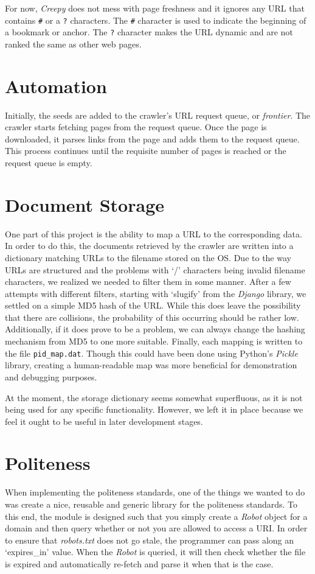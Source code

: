 \documentclass[letterpaper,11pt,twoside]{article}
\begin{document}
For now, \emph{Creepy} does not mess with page freshness and it ignores any URL that contains \texttt{\#} or a \texttt{?} characters. The \texttt{\#} character is used to indicate the beginning of a bookmark or anchor. The \texttt{?} character makes the URL dynamic and are not ranked the same as other web pages.

\section{Automation}
Initially, the seeds are added to the crawler's URL request queue, or \emph{frontier}. The crawler starts fetching pages from the request queue. Once the page is downloaded, it parses links from the page and adds them to the request queue. This process continues until the requisite number of pages is reached or the request queue is empty.

\section{Document Storage}
One part of this project is the ability to map a URL to the corresponding data. In order to do this, the documents retrieved by the crawler are written into a dictionary matching URLs to the filename stored on the OS. Due to the way URLs are structured and the problems with `/' characters being invalid filename characters, we realized we needed to filter them in some manner. After a few attempts with different filters, starting with `slugify' from the \emph{Django} library, we settled on a simple MD5 hash of the URL. While this does leave the possibility that there are collisions, the probability of this occurring should be rather low. Additionally, if it does prove to be a problem, we can always change the hashing mechanism from MD5 to one more suitable. Finally, each mapping is written to the file \texttt{pid\_map.dat}. Though this could have been done using Python's \emph{Pickle} library, creating a human-readable map was more beneficial for demonstration and debugging purposes.

At the moment, the storage dictionary seems somewhat superfluous, as it is not being used for any specific functionality. However, we left it in place because we feel it ought to be useful in later development stages.

\section{Politeness}
When implementing the politeness standards, one of the things we wanted to do was create a nice, reusable and generic library for the politeness standards. To this end, the module is designed such that you simply create a \emph{Robot} object for a domain and then query whether or not you are allowed to access a URI. In order to ensure that \emph{robots.txt} does not go stale, the programmer can pass along an `expires\_in' value. When the \emph{Robot} is queried, it will then check whether the file is expired and automatically re-fetch and parse it when that is the case.
\end{document}
